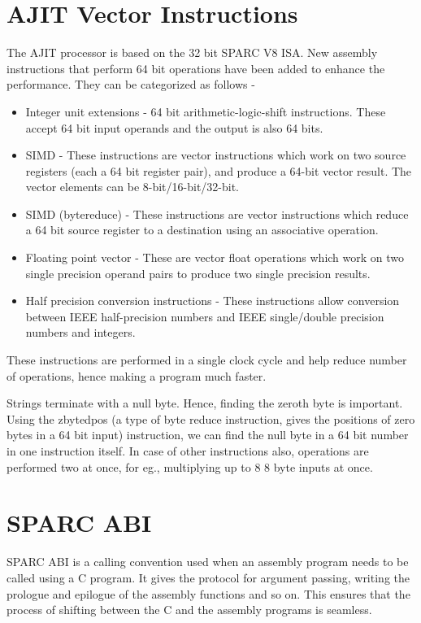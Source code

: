 \documentclass[12pt]{article}
\begin{document}
\section{AJIT Vector Instructions}

The AJIT processor is based on the 32 bit SPARC V8 ISA. New assembly instructions that perform 64 bit operations have been added to enhance the performance.
They can be categorized as follows - 
\begin{itemize}
    \item Integer unit extensions - 64 bit arithmetic-logic-shift instructions. These accept 64 bit input operands and the output is also 64 bits.
    \item SIMD - These instructions are vector instructions which work on two source registers (each a 64 bit register pair), and produce a 64-bit vector result.  The vector elements can be 8-bit/16-bit/32-bit.
    \item SIMD (bytereduce) - These instructions are vector instructions which reduce a 64 bit source register to a destination using an associative operation.    
    \item Floating point vector -  These are vector float operations which work on two single precision operand pairs to produce two single precision results.
    \item  Half precision conversion instructions - These instructions allow conversion between IEEE half-precision
    numbers and IEEE single/double precision numbers and integers.      
\end{itemize}

These instructions are performed in a single clock cycle and  help reduce number of operations, hence making a program much faster.\newline

Strings terminate with a null byte. Hence, finding the zeroth byte is important. Using the zbytedpos (a type of byte reduce instruction, gives the positions of zero bytes in a 64 bit input) instruction, we can find the null byte in a 64 bit number in one instruction itself. 
In case of other instructions also, operations are performed two at once, for eg., multiplying up to 8 8 byte inputs at once. 


\section{SPARC ABI}

SPARC ABI is a calling convention used when an assembly program needs to be called using a C program.  It gives the protocol for argument passing, writing the prologue and epilogue of the assembly functions and so on. This ensures that the process of shifting between the C and the assembly programs is seamless. 
\end{document}
